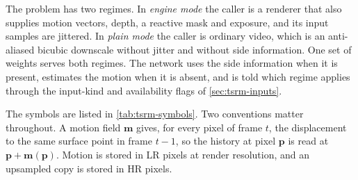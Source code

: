 The problem has two regimes. In \emph{engine mode} the caller is a renderer that also supplies motion vectors, depth, a reactive mask and exposure, and its input samples are jittered. In \emph{plain mode} the caller is ordinary video, which is an anti-aliased bicubic downscale without jitter and without side information. One set of weights serves both regimes. The network uses the side information when it is present, estimates the motion when it is absent, and is told which regime applies through the input-kind and availability flags of \cref{sec:tsrm-inputs}.

The symbols are listed in \cref{tab:tsrm-symbols}. Two conventions matter throughout. A motion field $\mathbf{m}$ gives, for every pixel of frame $t$, the displacement to the same surface point in frame $t-1$, so the history at pixel $\mathbf{p}$ is read at $\mathbf{p}+\mathbf{m}(\mathbf{p})$. Motion is stored in LR pixels at render resolution, and an upsampled copy is stored in HR pixels.

